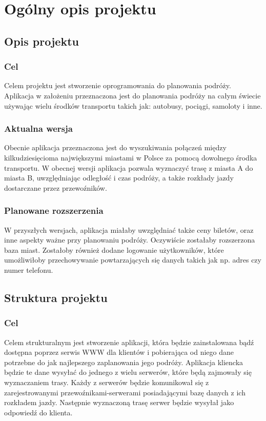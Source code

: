 \documentclass[pdftex,13pt,a4paper]{article}
\begin{document}
\newpage
\section{Ogólny opis projektu}

\subsection{Opis projektu}

\subsubsection{Cel}
Celem projektu jest stworzenie oprogramowania do planowania podróży. Aplikacja w założeniu przeznaczona jest do planowania podróży na całym świecie używając wielu środków transportu takich jak: autobusy, pociągi, samoloty i inne.

\subsubsection{Aktualna wersja}
Obecnie aplikacja przeznaczona jest do wyszukiwania połączeń między kilkudziesięcioma największymi miastami w Polsce za pomocą dowolnego środka transportu. W obecnej wersji aplikacja pozwala wyznaczyć trasę z miasta A do miasta B, uwzględniając odległość i czas podróży, a także rozkłady jazdy dostarczane przez przewoźników.

\subsubsection{Planowane rozszerzenia}
W przyszłych wersjach, aplikacja miałaby uwzględniać także ceny biletów, oraz inne aspekty ważne przy planowaniu podróży. Oczywiście zostałaby rozszerzona baza miast. Zostałoby również dodane logowanie użytkowników, które umożliwiłoby przechowywanie powtarzających się danych takich jak np. adres czy numer telefonu.


\subsection{Struktura projektu}

\subsubsection{Cel}
Celem strukturalnym jest stworzenie aplikacji, która będzie zainstalowana bądź dostępna poprzez serwis WWW dla klientów i pobierająca od niego dane potrzebne do jak najlepszego zaplanowania jego podróży. Aplikacja kliencka będzie te dane wysyłać do jednego z wielu serwerów, które będą zajmowały się wyznaczaniem trasy. Każdy z serwerów będzie komunikował się z zarejestrowanymi przewoźnikami-serwerami posiadającymi bazę danych z ich rozkładem jazdy. Następnie wyznaczoną trasę serwer będzie wysyłał jako odpowiedź do klienta.
\end{document}
